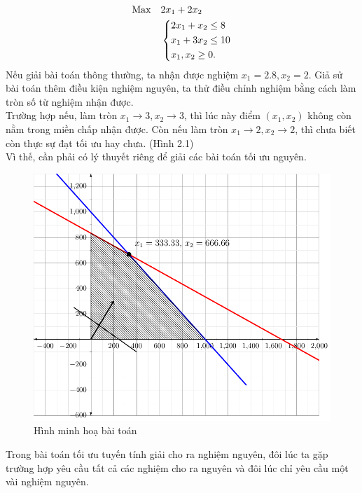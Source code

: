 \documentclass[12pt,a4paper]{report}
\begin{document}
\begin{equation*}
    \begin{split}
      \rm{Max} \quad & 2x_1+2x_2 \\
      &\left\{\begin{split}
          &2x_1+x_2 \le 8\\
          & x_1+3x_2 \le 10\\
          & x_1,x_2 \ge 0.\\
      \end{split}\right.
    \end{split}
\end{equation*}
Nếu giải bài toán thông thường, ta nhận được nghiệm $x_1=2.8,x_2=2$. Giả sử bài toán thêm điều kiện nghiệm nguyên, ta thử điều chỉnh nghiệm bằng cách làm tròn số từ nghiệm nhận được.\\
Trường hợp nếu, làm tròn $x_1 \to 3, x_2 \to 3$, thì lúc này điểm $(x_1,x_2)$ không còn nằm trong miền chấp nhận được. Còn nếu làm tròn $x_1 \to 2, x_2 \to 2$, thì chưa biết còn thực sự đạt tối ưu hay chưa. (Hình 2.1)\\
Vì thế, cần phải có lý thuyết riêng để giải các bài toán tối ưu nguyên.

\begin{figure}
\centering
\includegraphics[width=0.8\linewidth]{plot.pdf}
\caption{Hình minh hoạ bài toán}
\end{figure}






Trong bài toán tối ưu tuyến tính giải cho ra nghiệm nguyên, đôi lúc ta gặp trường hợp yêu cầu tất cả các nghiệm cho ra nguyên và đôi lúc chỉ yêu cầu một vài nghiệm nguyên.
\end{document}
